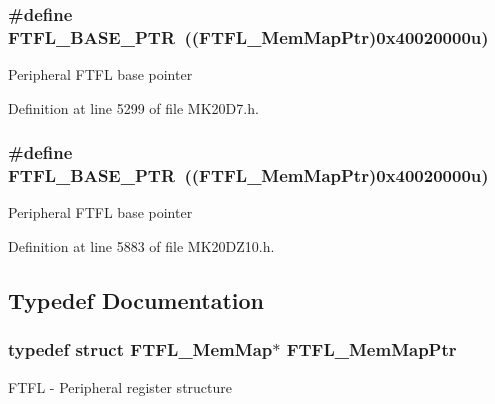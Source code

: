 \subsubsection[{\texorpdfstring{F\+T\+F\+L\+\_\+\+B\+A\+S\+E\+\_\+\+P\+TR}{FTFL_BASE_PTR}}]{\setlength{\rightskip}{0pt plus 5cm}\#define F\+T\+F\+L\+\_\+\+B\+A\+S\+E\+\_\+\+P\+TR~(({\bf F\+T\+F\+L\+\_\+\+Mem\+Map\+Ptr})0x40020000u)}\hypertarget{group___f_t_f_l___peripheral_gad2bcbae914ba8547b96791479afda939}{}\label{group___f_t_f_l___peripheral_gad2bcbae914ba8547b96791479afda939}
Peripheral F\+T\+FL base pointer 

Definition at line 5299 of file M\+K20\+D7.\+h.

\subsubsection[{\texorpdfstring{F\+T\+F\+L\+\_\+\+B\+A\+S\+E\+\_\+\+P\+TR}{FTFL_BASE_PTR}}]{\setlength{\rightskip}{0pt plus 5cm}\#define F\+T\+F\+L\+\_\+\+B\+A\+S\+E\+\_\+\+P\+TR~(({\bf F\+T\+F\+L\+\_\+\+Mem\+Map\+Ptr})0x40020000u)}\hypertarget{group___f_t_f_l___peripheral_gad2bcbae914ba8547b96791479afda939}{}\label{group___f_t_f_l___peripheral_gad2bcbae914ba8547b96791479afda939}
Peripheral F\+T\+FL base pointer 

Definition at line 5883 of file M\+K20\+D\+Z10.\+h.



\subsection{Typedef Documentation}
\subsubsection[{\texorpdfstring{F\+T\+F\+L\+\_\+\+Mem\+Map\+Ptr}{FTFL_MemMapPtr}}]{\setlength{\rightskip}{0pt plus 5cm}typedef struct {\bf F\+T\+F\+L\+\_\+\+Mem\+Map}$\ast$ {\bf F\+T\+F\+L\+\_\+\+Mem\+Map\+Ptr}}\hypertarget{group___f_t_f_l___peripheral_ga7bcba0a1f0abf588061f4ab257e3fe48}{}\label{group___f_t_f_l___peripheral_ga7bcba0a1f0abf588061f4ab257e3fe48}
F\+T\+FL -\/ Peripheral register structure 

